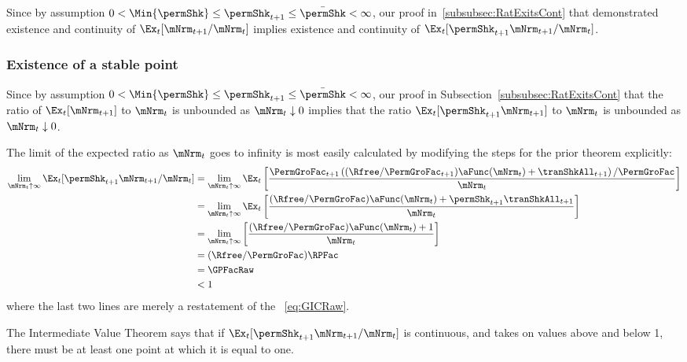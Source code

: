 \documentclass[\econtexRoot/BufferStockTheory]{subfiles}
\begin{document}
Since by assumption $ 0 < \Min{\permShk} \leq \permShk_{t+1} \leq \bar{\permShk} < \infty$, our proof in~\ref{subsubsec:RatExitsCont} that demonstrated existence and continuity of $\Ex_{t}[\mNrm_{t+1}/\mNrm_{t}]$ implies existence and continuity of $\Ex_{t}[\permShk_{t+1}\mNrm_{t+1}/\mNrm_{t}]$.

\subsubsection{Existence of a stable point}

Since by assumption $ 0 < \Min{\permShk} \leq \permShk_{t+1} \leq \bar{\permShk} < \infty$, our proof in Subsection~\ref{subsubsec:RatExitsCont} that the ratio of $\Ex_{t}[\mNrm_{t+1}]$ to $\mNrm_{t}$ is unbounded as $\mNrm_{t} \downarrow 0$ implies that the ratio $\Ex_{t}[\permShk_{t+1}\mNrm_{t+1}]$ to $\mNrm_{t}$ is unbounded as $\mNrm_{t} \downarrow 0$.

  
The limit of the expected ratio as $\mNrm_{t}$ goes to infinity is most easily calculated by modifying the steps for the prior theorem explicitly:
\begin{align}
  \lim_{\mNrm_{t} \uparrow \infty} \Ex_{t}[\permShk_{t+1}\mNrm_{t+1}/\mNrm_{t}]  & =   
                                                                  \lim_{\mNrm_{t} \uparrow \infty} 
                                                                  \Ex_{t}\left[\frac{\PermGroFac_{t+1}\left((\Rfree/\PermGroFac_{t+1})\aFunc(\mNrm_{t})+{\tranShkAll}_{t+1}\right)/\PermGroFac}{\mNrm_{t}}\right] \notag 
  \\   & =   \lim_{\mNrm_{t} \uparrow \infty} \Ex_{t}\left[
         \frac{(\Rfree/\PermGroFac)\aFunc(\mNrm_{t})+\permShk_{t+1}{\tranShkAll}_{t+1}}{\mNrm_{t}}
         \right] \notag 
  \\   & =   \lim_{\mNrm_{t} \uparrow \infty} \left[
         \frac{(\Rfree/\PermGroFac)\aFunc(\mNrm_{t})+1}{\mNrm_{t}}
         \right] \notag 
  \\  & = (\Rfree/\PermGroFac)\RPFac \label{eq:emgro2}
  \\  & = \GPFacRaw \notag
  \\  & < 1 \notag
\end{align}
where the last two lines are merely a restatement of the \GICRaw~\eqref{eq:GICRaw}.

The Intermediate Value Theorem says that if $\Ex_{t}[\permShk_{t+1}\mNrm_{t+1}/\mNrm_t]$ is continuous, and takes on values above and below 1, there must be at least one point at which it is equal to one.
\end{document}
